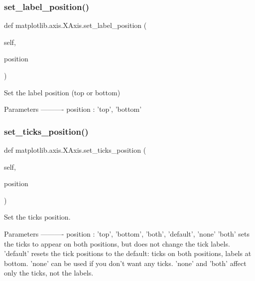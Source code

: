 \subsubsection{\texorpdfstring{set\+\_\+label\+\_\+position()}{set\_label\_position()}}
{\footnotesize\ttfamily def matplotlib.\+axis.\+X\+Axis.\+set\+\_\+label\+\_\+position (\begin{DoxyParamCaption}\item[{}]{self,  }\item[{}]{position }\end{DoxyParamCaption})}

\begin{DoxyVerb}Set the label position (top or bottom)

Parameters
----------
position : {'top', 'bottom'}
\end{DoxyVerb}
 \mbox{\label{classmatplotlib_1_1axis_1_1XAxis_ac33c0698c69145e1e576a599e20ac48e}} 
\subsubsection{\texorpdfstring{set\+\_\+ticks\+\_\+position()}{set\_ticks\_position()}}
{\footnotesize\ttfamily def matplotlib.\+axis.\+X\+Axis.\+set\+\_\+ticks\+\_\+position (\begin{DoxyParamCaption}\item[{}]{self,  }\item[{}]{position }\end{DoxyParamCaption})}

\begin{DoxyVerb}Set the ticks position.

Parameters
----------
position : {'top', 'bottom', 'both', 'default', 'none'}
    'both' sets the ticks to appear on both positions, but does not
    change the tick labels.  'default' resets the tick positions to
    the default: ticks on both positions, labels at bottom.  'none'
    can be used if you don't want any ticks. 'none' and 'both'
    affect only the ticks, not the labels.
\end{DoxyVerb}
 \mbox{\label{classmatplotlib_1_1axis_1_1XAxis_a2ab8ec8b335f2308bad82c67e6e3ff8b}} 

